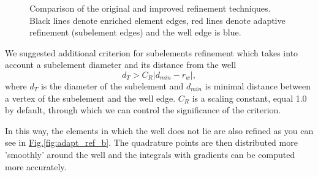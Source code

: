 \documentclass[preprint,12pt]{elsarticle}
\newcommand{\fig}[1]{\hyperref[#1]{Fig.\ref{#1}}}
\begin{document}
\begin{figure}[!htb]
  \centering    
  \hspace{0pt}
  \caption[Adaptive refinement comparison]
  {Comparison of the original and improved refinement techniques.
   Black lines denote enriched element edges, red lines denote adaptive refinement (subelement edges) and the well
   edge is blue.
  }
  \label{fig:adapt_refinement}
\end{figure}

We suggested additional criterion for subelements refinement which takes into account a subelement diameter 
and its distance from the well
\begin{equation}
  d_T > C_R|d_{min} - r_w|,
\end{equation}
where $d_T$ is the diameter of the subelement and $d_{min}$ is minimal distance between a vertex of 
the subelement and the well edge. $C_R$ is a scaling constant, equal 1.0 by default, through which we can 
control the significance of the criterion.

In this way, the elements in which the well does not lie are also refined as you can see in 
\fig{fig:adapt_ref_b}. The quadrature points are then distributed more 'smoothly' around the well and the
integrals with gradients can be computed more accurately. 
\end{document}
